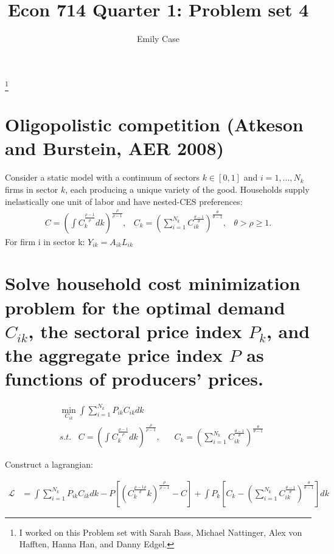 \documentclass[12pt,oneside,reqno]{amsart}
\title{Econ 714 Quarter 1: Problem set 4 }
\author{Emily Case}
\newcommand\blfootnote[1]{%
	\begingroup
	\renewcommand\thefootnote{}\footnote{#1}%
	\addtocounter{footnote}{-1}%
	\endgroup
}
\newcommand{\lag}{\mathcal{L}}
\begin{document}
	
	\maketitle
	
	\blfootnote{I worked on this Problem set with Sarah Bass, Michael Nattinger, Alex von Hafften, Hanna Han, and Danny Edgel.} 



\newcommand{\sumi}{\sum_{i=1}^{N_k}}
\newcommand{\ik}{_{ik}}

\section*{Oligopolistic competition (Atkeson and Burstein, AER 2008)}
Consider a static model with a continuum of sectors $k\in[0,1]$ and $i= 1,...,N_k$ firms in sector $k$, each producing a unique variety of the good.  Households supply inelastically one unit of labor and have nested-CES preferences:
\begin{align*}
& C = \left( \int C_k^{\frac{\rho-1}{\rho}}dk\right)^{\frac{\rho}{\rho-1}},
& C_k = \left( \sum_{i=1}^{N_k} C_{ik}^{\frac{\theta-1}{\theta}}\right)^{\frac{\theta}{\theta-1}},
& \theta > \rho \ge 1.&
\end{align*}
For firm i in sector k: $ Y_{ik}= A_{ik}L_{ik}$ 



\section{Solve household cost minimization problem for the optimal demand $C_{ik}$, the sectoral price index $P_k$, and the aggregate price index $P$ as functions of producers’ prices.}
\begin{align*}
& \min_{C_{ik}} \int \sumi P\ik C\ik dk \\
& s.t.\;\;\; 
C = \left( \int C_k^{\frac{\rho-1}{\rho}}dk\right)^{\frac{\rho}{\rho-1}},\;\;\; 
& C_k = \left( \sum_{i=1}^{N_k} C_{ik}^{\frac{\theta-1}{\theta}}\right)^{\frac{\theta}{\theta-1}}
\end{align*}

Construct a lagrangian:

\begin{align*}
\lag & = \int \sumi P\ik C\ik dk 
         - P \left[\left( C_k^\frac{{\rho-1}{\rho}} dk
         \right)
         ^{\frac{\rho}{\rho-1}} - C \right]
         + \int P_k \left[C_k - \left(\sumi C\ik 
         ^{\frac{\theta-1}{\theta}}
         \right)^{\frac{\theta
         }{\theta-1}}\right] dk
\end{align*}
\end{document}
